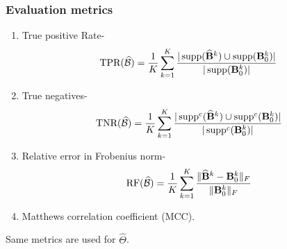 \documentclass[10pt]{beamer}
\theoremstyle{definition}
\DeclareMathOperator*{\supp}{\text{supp}}
\begin{document}
\begin{frame}
\frametitle{Evaluation metrics}
\begin{enumerate}
\item True positive Rate-
%
\[
\text{TPR} (\widehat \cB) = \frac{1}{K} \sum_{k=1}^K \frac{ | \supp(\widehat \bfB^k) \cup \supp (\bfB_0^k)|}{ | \supp (\bfB_0^k)| }
\]
\item True negatives-
%
\[
\text{TNR} (\widehat \cB) = \frac{1}{K} \sum_{k=1}^K \frac{ | \supp^c(\widehat \bfB^k) \cup \supp^c (\bfB_0^k)|}{ | \supp^c (\bfB_0^k)| }
\]
%
\item Relative error in Frobenius norm-
%
\[
\text{RF} (\widehat {{\cal{B}}}) = \frac{1}{K} \sum_{k=1}^K \frac{\| \widehat {{\mathbf{B}}}^k - {\mathbf{B}}_0^k \|_F}{\| {\mathbf{B}}_0^k \|_F}
\]
%

\item Matthews correlation coefficient (MCC).
\end{enumerate}

Same metrics are used for $\widehat \Theta$.
\end{frame}
\end{document}
